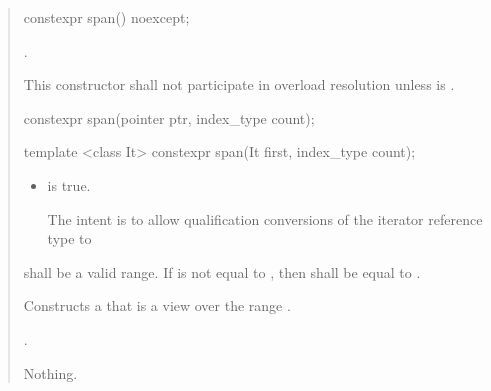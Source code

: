 \documentclass{wg21}
\begin{document}
\begin{quote}


\begin{itemdecl}
    constexpr span() noexcept;
\end{itemdecl}
\begin{itemdescr}
    \pnum
    \ensures
    .

    \pnum
    \remarks
    This constructor shall not participate in overload resolution
    unless  is .
\end{itemdescr}
\begin{removedblock}
\begin{itemdecl}
constexpr span(pointer ptr, index_type count);
\end{itemdecl}
\end{removedblock}
\begin{addedblock}
\begin{itemdecl}
template <class It>
constexpr span(It first, index_type count);
\end{itemdecl}
\end{addedblock}
\begin{itemdescr}
    \begin{addedblock}
    \pnum
    \constraints
    \begin{itemize}
    	\item {} is true.
    	 \begin{note}The intent is to allow qualification conversions of the iterator reference type to  \end{note}
    \end{itemize}
    \end{addedblock}

    \expects
     shall be a valid range.
    If  is not equal to ,
    then  shall be equal to .

    \pnum
    \effects
    Constructs a  that is a view over the range .

    \pnum
    \ensures
    .

    \pnum
    \throws
    Nothing.

\end{itemdescr}



\end{quote}
\end{document}
